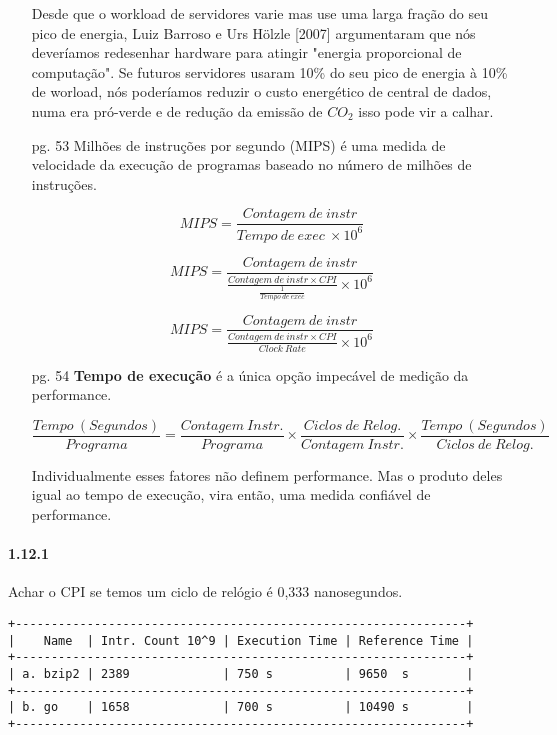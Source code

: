 \documentclass{article}
\begin{document}
\begin{enumerate}
Desde que o workload de servidores varie mas use uma larga fração do seu pico de
energia, Luiz Barroso e Urs Hölzle [2007] argumentaram que nós deveríamos
redesenhar hardware para atingir "energia proporcional de computação". Se
futuros servidores usaram 10\% do seu pico de energia à 10\% de worload, nós
poderíamos reduzir o custo energético de central de dados, numa era pró-verde e
de redução da emissão de $CO_{2}$ isso pode vir a calhar.

\item[pg. 53] Milhões de instruções por segundo (MIPS) é uma medida de
velocidade da execução de programas baseado no número de milhões de instruções.

$$MIPS = \frac{Contagem\ de\ instr}{Tempo\ de\ exec\ \times  10^{6}}$$

$$MIPS = \frac{Contagem\ de\ instr}{\frac{Contagem\ de\ instr \times
CPI}{\frac{1}{Tempo\ de\ exec}} \times 10^{6}}$$

$$MIPS = \frac{Contagem\ de\ instr}{\frac{Contagem\ de\ instr \times
CPI}{Clock\ Rate} \times 10^{6}}$$

\item[pg. 54] \textbf{Tempo de execução} é a única opção impecável de medição 
da performance.

$$\frac{Tempo\ (Segundos)}{Programa} = \frac{Contagem\ Instr.}{Programa} \times 
\frac{Ciclos\ de\ Relog.}{Contagem\ Instr.} \times \frac{Tempo\ 
(Segundos)}{Ciclos\ de\ Relog.}$$

Individualmente esses fatores não definem performance. Mas o produto deles 
igual ao tempo de execução, vira então, uma medida confiável de performance.
\end{enumerate}


\paragraph{1.12.1} Achar o CPI se temos um ciclo de relógio é 0,333 
nanosegundos.

\begin{verbatim}
+---------------------------------------------------------------+
|    Name  | Intr. Count 10^9 | Execution Time | Reference Time |
+---------------------------------------------------------------+
| a. bzip2 | 2389             | 750 s          | 9650  s        |
+---------------------------------------------------------------+
| b. go    | 1658             | 700 s          | 10490 s        |
+---------------------------------------------------------------+
\end{verbatim}
\end{document}
